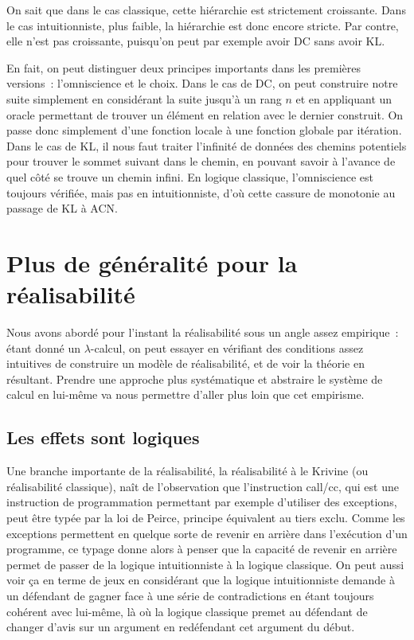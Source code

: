 \documentclass{article}
\begin{document}
On sait que dans le cas classique, cette hiérarchie est strictement croissante. Dans le cas intuitionniste, plus faible, la hiérarchie est donc encore stricte. Par contre, elle n'est pas croissante, puisqu'on peut par exemple avoir DC sans avoir KL.

En fait, on peut distinguer deux principes importants dans les premières versions~: l'omniscience et le choix. Dans le cas de DC, on peut construire notre suite simplement en considérant la suite jusqu'à un rang $n$ et en appliquant un oracle permettant de trouver un élément en relation avec le dernier construit. On passe donc simplement d'une fonction locale à une fonction globale par itération. Dans le cas de KL, il nous faut traiter l'infinité de données des chemins potentiels pour trouver le sommet suivant dans le chemin, en pouvant savoir à l'avance de quel côté se trouve un chemin infini. En logique classique, l'omniscience est toujours vérifiée, mais pas en intuitionniste, d'où cette cassure de monotonie au passage de KL à ACN.

\section{Plus de généralité pour la réalisabilité}

Nous avons abordé pour l'instant la réalisabilité sous un angle assez empirique~: étant donné un $\lambda$-calcul, on peut essayer en vérifiant des conditions assez intuitives de construire un modèle de réalisabilité, et de voir la théorie en résultant. Prendre une approche plus systématique et abstraire le système de calcul en lui-même va nous permettre d'aller plus loin que cet empirisme.

\subsection{Les effets sont logiques}

Une branche importante de la réalisabilité, la réalisabilité à le Krivine (ou réalisabilité classique), naît de l'observation que l'instruction call/cc, qui est une instruction de programmation permettant par exemple d'utiliser des exceptions, peut être typée par la loi de Peirce, principe équivalent au tiers exclu. Comme les exceptions permettent en quelque sorte de revenir en arrière dans l'exécution d'un programme, ce typage donne alors à penser que la capacité de revenir en arrière permet de passer de la logique intuitionniste à la logique classique. On peut aussi voir ça en terme de jeux en considérant que la logique intuitionniste demande à un défendant de gagner face à une série de contradictions en étant toujours cohérent avec lui-même, là où la logique classique premet au défendant de changer d'avis sur un argument en redéfendant cet argument du début.
\end{document}
